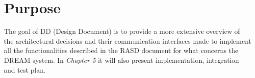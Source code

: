 \section{Purpose}
The goal of DD (Design Document) is to provide a more extensive overview of the architectural decisions and their communication interfaces made to implement all the functionalities described in the RASD document for what concerns the DREAM system.
In \textit{Chapter 5} it will also present implementation, integration and test plan.